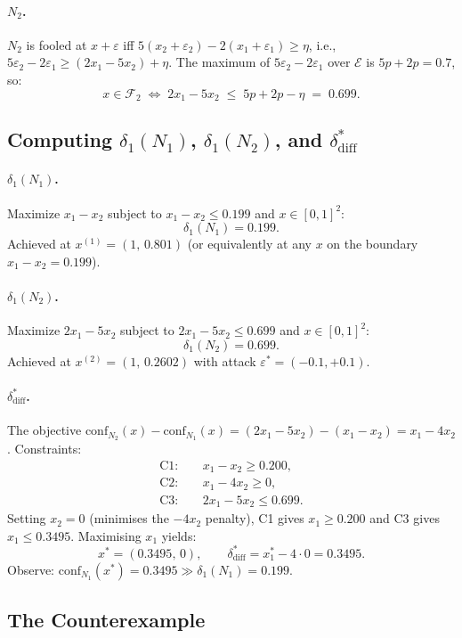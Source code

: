 \documentclass[12pt]{article}
\theoremstyle{definition}
\theoremstyle{plain}
\theoremstyle{remark}
\newcommand{\conf}[2]{\mathrm{conf}_{#1}(#2)}
\newcommand{\dN}[1]{\delta_1(N_{#1})}
\newcommand{\ddiff}{\delta_{\mathrm{diff}}^{*}}
\newcommand{\Edom}{\mathcal{E}}
\newcommand{\Ffool}[1]{\mathcal{F}_{#1}}
\begin{document}
\paragraph{$N_2$.}
$N_2$ is fooled at $x+\varepsilon$ iff
$5(x_2+\varepsilon_2)-2(x_1+\varepsilon_1)\geq\eta$,
i.e., $5\varepsilon_2-2\varepsilon_1\geq(2x_1-5x_2)+\eta$.
The maximum of $5\varepsilon_2-2\varepsilon_1$ over $\Edom$ is
$5p+2p=0.7$, so:
\[
  x\in\Ffool{2}
  \;\Longleftrightarrow\;
  2x_1-5x_2\;\leq\;5p+2p-\eta\;=\;0.699.
\]

\subsection{Computing $\dN{1}$, $\dN{2}$, and $\ddiff$}

\paragraph{$\dN{1}$.}
Maximize $x_1-x_2$ subject to $x_1-x_2\leq 0.199$ and $x\in[0,1]^2$:
\[
  \dN{1}=0.199.
\]
Achieved at $x^{(1)}=(1,\,0.801)$
(or equivalently at any $x$ on the boundary $x_1-x_2=0.199$).

\paragraph{$\dN{2}$.}
Maximize $2x_1-5x_2$ subject to $2x_1-5x_2\leq 0.699$ and $x\in[0,1]^2$:
\[
  \dN{2}=0.699.
\]
Achieved at $x^{(2)}=(1,\,0.2602)$ with attack $\varepsilon^*=(-0.1,+0.1)$.

\paragraph{$\ddiff$.}
The objective $\conf{N_2}{x}-\conf{N_1}{x}=(2x_1-5x_2)-(x_1-x_2)=x_1-4x_2$.
Constraints:
\begin{align*}
  \mathrm{C1}:&\quad x_1-x_2\geq 0.200,\\
  \mathrm{C2}:&\quad x_1-4x_2\geq 0,\\
  \mathrm{C3}:&\quad 2x_1-5x_2\leq 0.699.
\end{align*}
Setting $x_2=0$ (minimises the $-4x_2$ penalty), C1 gives $x_1\geq 0.200$
and C3 gives $x_1\leq 0.3495$. Maximising $x_1$ yields:
\[
  x^*=(0.3495,\,0),
  \qquad
  \ddiff=x_1^*-4\cdot 0=\mathbf{0.3495}.
\]
Observe: $\conf{N_1}{x^*}=0.3495\gg\dN{1}=0.199$.

\subsection{The Counterexample}
\end{document}
